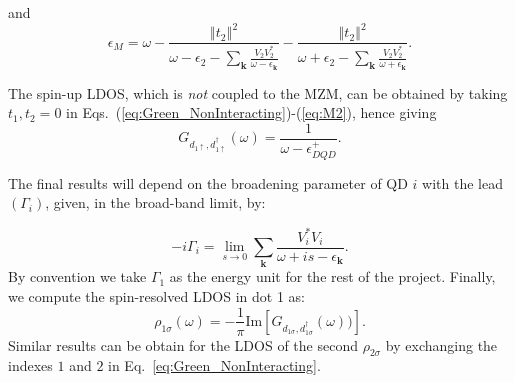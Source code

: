 \documentclass[showpacs,aps,prb,reprint,superscriptaddress]{revtex4-2}
\begin{document}
\noindent and
\begin{equation}
    \epsilon_{M}=\omega-\frac{\left\Vert t_{2}\right\Vert ^{2} } {\omega-\epsilon_{2}-\sum_{\mathbf{k}}\frac{V_{2}V_{2}^{*}}{\omega-\epsilon_{\mathbf{k}}}}-\frac{\left\Vert t_{2}\right\Vert ^{2}}{\omega+\epsilon_{2}-\sum_{\mathbf{k}}\frac{V_{2}V_{2}^{*}}{\omega+\epsilon_{\mathbf{k}}}}. \label{eq:M2}
\end{equation}




\noindent The spin-up LDOS, which is \textit{not} coupled to the MZM, can be obtained by taking $t_1,t_2 = 0$ in Eqs.\ (\ref{eq:Green_NonInteracting})-(\ref{eq:M2}), hence giving
\begin{equation}
    G_{{d_{1\uparrow},d_{1\uparrow}^{\dagger}}}\left(\omega\right)=\frac{1}{\omega-\epsilon_{DQD}^{+}}.
    \label{eq:Green_NonInteracting}
\end{equation}


The final results will depend on the broadening parameter of QD $i$ with the lead $(\Gamma_i)$, given, in the broad-band limit, by:

\begin{equation}
   -i\Gamma_i = \lim_{s\rightarrow 0} \sum_{\boldsymbol{k}}\frac{V_{i}^{*}V_{i}}{\omega+ is -\epsilon_{\boldsymbol{k}}}.
\end{equation}
\noindent By convention we take $\Gamma_1$ as the energy unit for the rest of the project. Finally, we compute the spin-resolved LDOS in dot 1 as:
%  
\begin{equation}
    \rho_{1\sigma}(\omega)=-\frac{1}{\pi} \textrm{Im} \left[G_{d_{1\sigma},d_{1\sigma}^\dagger}(\omega))\right].
    \label{eq:Density of States}
\end{equation}
\noindent Similar results can be obtain for the LDOS of the second $\rho_{2\sigma}$ by exchanging the indexes $1$ and $2$ in Eq.\ \eqref{eq:Green_NonInteracting}. 
\end{document}
